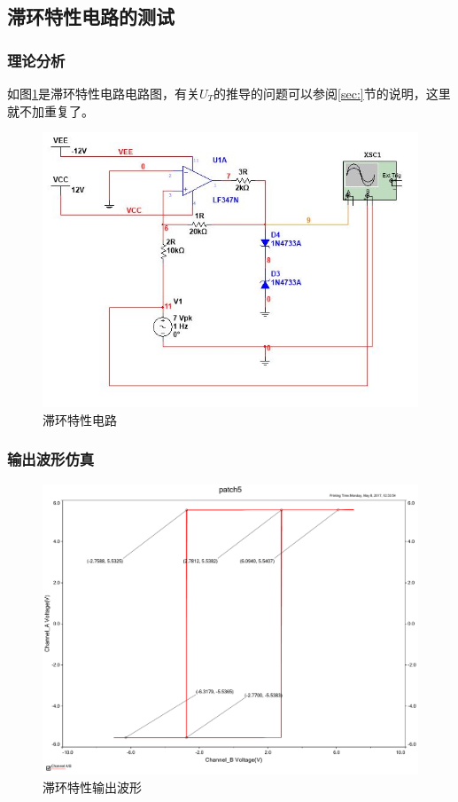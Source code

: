 \documentclass[UTF8,a4paper]{paper}
\begin{document}
\subsection{滞环特性电路的测试}
\subsubsection{理论分析}
如图\ref{schiCrit}是滞环特性电路电路图，有关$U_T$的推导的问题可以参阅\ref{sec:}节的说明，这里就不加重复了。
\begin {figure}
\includegraphics [width=\textwidth]{sch.jpg}
\caption{滞环特性电路}
\label{schiCrit}
\end {figure}
\subsubsection{输出波形仿真}
\begin{figure}
\centering
\includegraphics[width=\textwidth]{sch.pdf}
\caption{滞环特性输出波形}
\label{BI}
\end{figure}
\end{document}

